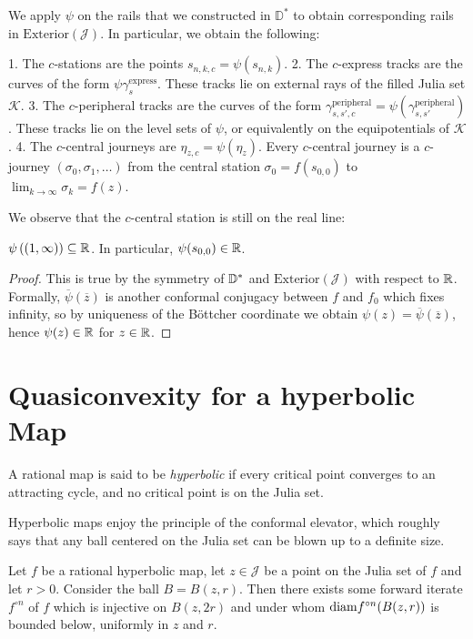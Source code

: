 We apply $\psi$ on the rails that we constructed in $\mathbb D^*$ to obtain corresponding rails in $\mathrm{Exterior}(\mathcal{J})$.
In particular, we obtain the following:
\begin{definition}
1. The 	$c$-stations are the points  $s_{n,k,c}=\psi(s_{n,k})$.
2. The 	$c$-express tracks are the curves of the form $\psi \gamma_{s}^{\text{express}}$. These tracks lie on external rays of the filled Julia set $\mathcal K$.
3. The $c$-peripheral tracks are the curves of the form $\gamma_{s,s',c}^{\text{peripheral}}=\psi(\gamma_{s,s'}^{\text{peripheral}})$. These tracks lie on the level sets of $\psi$, or equivalently on the equipotentials of $\mathcal K$.
4.  The $c$-central journeys are $\eta_{z,c}=\psi(\eta_z)$. Every $c$-central journey is a $c$-journey $\left(\sigma_{0},\sigma_{1},\ldots\right)$
from the central station $\sigma_{0}=f(s_{0,0})$ to $\lim_{k\to \infty}\sigma_{k}=f(z)$.
\end{definition}

We observe that the $c$-central station is still on the real line:

\begin{lemma}$\psi\left((1,\infty)\right)\subseteq\mathbb{R}$. In particular,
	$\psi(s_{0,0})\in\mathbb{R}$.
\end{lemma}
\begin{proof}
	This is true by the symmetry of $\mathbb{D}^{*}$ and $\mathrm{Exterior}(\mathcal{J})$
	with respect to $\mathbb{R}$. Formally, $\overline{\psi}(\overline{z})$
	is another conformal conjugacy between $f$ and $f_0$ which fixes infinity, so by uniqueness of the Böttcher coordinate we obtain $\psi(z)=\overline{\psi}(\overline{z})$,
	hence $\psi(z)\in\mathbb{R}$ for $z\in\mathbb{R}$.
\end{proof}

\section{Quasiconvexity for a hyperbolic Map}

A rational map is said to be \emph{hyperbolic }if every critical point
converges to an attracting cycle, and no critical point is on the
Julia set.

Hyperbolic maps enjoy the principle of the conformal elevator, which roughly says that any ball centered on the Julia set can be blown up to a definite size.

\begin{proposition} \label{elevator}
	Let $f$ be a rational hyperbolic map, let $z\in \mathcal J$ be a point on the Julia set of $f$ and let $r>0$. Consider the ball $B=B(z,r)$. Then there exists some forward iterate $f^{\circ n}$ of $f$ which is injective on $B(z,2r)$ and under whom 
	$\mathrm{\mathrm{diam}} {f^{\circ n}(B(z,r))}$ is bounded below, uniformly in $z$ and $r$. 
\end{proposition}

